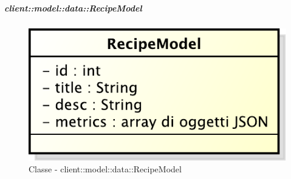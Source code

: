 
		\subparagraph{client::model::data::RecipeModel} %
		\label{subp:client_model_data_recipe}
			\begin{figure}[htbp]
				\centering
				\centerline{\includegraphics[scale=0.7]{./images/client/classes/model/recipe_model.pdf}}
				\caption{Classe - client::model::data::RecipeModel}
			\end{figure}
